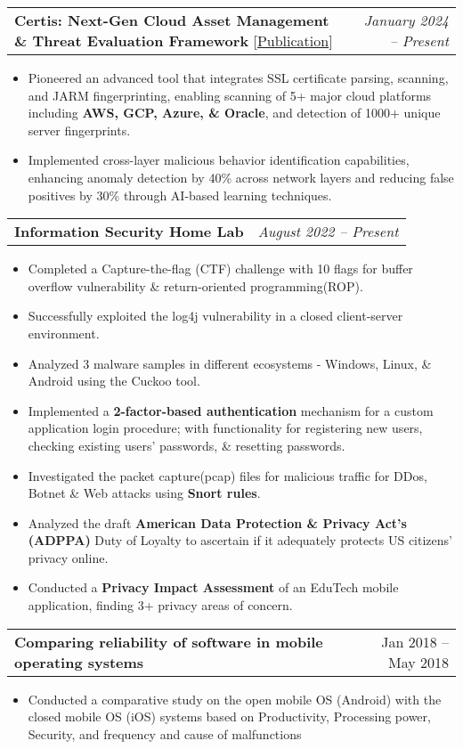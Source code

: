 \documentclass[letterpaper,11pt]{article}
\makeatletter
\newcommand{\resumeItem}[1]{
  \item\small{
    {#1 \vspace{-2pt}}
  }
}
\newcommand{\resumeProjectHeading}[2]{
    \item
    \begin{tabular*}{0.95\textwidth}{l@{\extracolsep{\fill}}r}
      \small#1 & #2 \\
    \end{tabular*}\vspace{-5pt}
}
\newcommand{\resumeItemListStart}{\begin{itemize}}
\newcommand{\resumeItemListEnd}{\end{itemize}\vspace{-5pt}}
\makeatother
\begin{document}
      
      \resumeProjectHeading
          {\textbf{Certis: Next-Gen Cloud Asset Management \& Threat Evaluation Framework} {\color{blue}[\href{https://doi.org/10.4236/jsea.2024.176026}{Publication}]}}{\textit{January 2024 -- Present}}
          \resumeItemListStart
            \resumeItem{Pioneered an advanced tool that integrates SSL certificate parsing, scanning, and JARM fingerprinting, enabling scanning of 5+ major cloud platforms including \textbf{AWS, GCP, Azure, \& Oracle}, and detection of 1000+ unique server fingerprints.}
            \resumeItem{Implemented cross-layer malicious behavior identification capabilities, enhancing anomaly detection by 40\% across network layers and reducing false positives by 30\% through AI-based learning techniques.}
            \resumeItemListEnd
      
      \resumeProjectHeading
          {\textbf{Information Security Home Lab}}{\textit{August 2022 -- Present}}
          \resumeItemListStart
            \resumeItem{Completed a Capture-the-flag (CTF) challenge with 10 flags for buffer overflow vulnerability \& return-oriented programming(ROP). }
            \resumeItem{Successfully exploited the log4j vulnerability in a closed client-server environment.}
            \resumeItem{Analyzed 3 malware samples in different ecosystems - Windows, Linux, \& Android using the Cuckoo tool.}
            \resumeItem{Implemented a \textbf{2-factor-based authentication} mechanism for a custom application login procedure; with functionality for registering new users, checking existing users' passwords, \& resetting passwords.}
            \resumeItem{Investigated the packet capture(pcap) files for malicious traffic for DDos, Botnet \& Web attacks using \textbf{Snort rules}. }
            \resumeItem{Analyzed the draft \textbf{American Data Protection \& Privacy Act's (ADPPA)} Duty of Loyalty to ascertain if it adequately protects US citizens' privacy online.}
            \resumeItem{Conducted a \textbf{Privacy Impact Assessment} of an EduTech mobile application, finding 3+ privacy areas of concern.}
            \resumeItemListEnd
          
    
      \resumeProjectHeading
          {\textbf{Comparing reliability of software in mobile operating systems}}{Jan 2018 -- May 2018}
          \resumeItemListStart
            \resumeItem{Conducted a comparative study on the open mobile OS (Android) with the closed mobile OS (iOS) systems based on Productivity, Processing power, Security, and frequency and cause of malfunctions}
          \resumeItemListEnd
    
\end{document}
